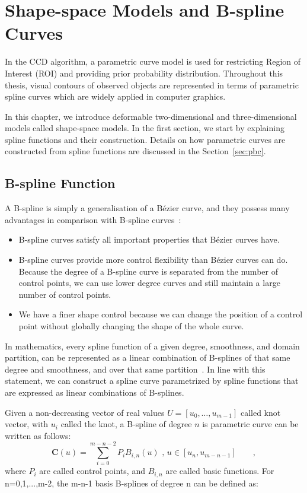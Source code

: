 \chapter{Shape-space Models and B-spline Curves}
\label{chapter:bspline}
In the CCD algorithm, a parametric curve model is used for
restricting Region of Interest (ROI) and providing prior probability distribution. 
Throughout this thesis, visual contours of observed objects are represented in terms of
parametric spline curves which are widely applied in computer graphics.

In this chapter, we introduce deformable two-dimensional and three-dimensional models called
shape-space models.  In the first section, we start by explaining
spline functions and their construction. Details on how parametric
curves are constructed from spline functions are discussed in the
Section~\ref{sec:pbc}. %
\section{B-spline Function}
\label{sec:bsc}
A B-spline is simply a generalisation of a B\'ezier curve, and they possess many
advantages in comparison with B-spline curves~\cite{compgeo}:
\begin{itemize}
\item B-spline curves satisfy all important properties that B\'ezier curves have.
\item B-spline curves provide more control flexibility than B\'ezier
  curves can do. Because the degree of a B-spline curve is separated
  from the number of control points, we can use lower degree curves
  and still maintain a large number of control points.
\item We have a finer shape control because we can change the position
  of a control point without globally changing the shape of
  the whole curve.
\end{itemize} 

In mathematics, every spline function of a given degree,
smoothness, and domain partition, can be represented as a linear
combination of B-splines of that same degree and smoothness, and over
that same partition~\cite{press2007numerical}. In line with this statement, we can
construct  a spline curve parametrized by spline functions that are
expressed as linear combinations of B-splines. 

Given a non-decreasing vector of real values $U = [u_0, \ldots,
u_{m-1}]$ called knot vector, with $u_i$ called the knot, a
B-spline of degree $n$ is parametric curve can be written as follows:
\begin{equation}
  \label{eq:4.1}
  \mathbf{C}(u) =  \sum_{i=0}^{m-n-2} P_{i} B_{i,n}(u) \mbox{ , } u \in [u_{n},u_{m-n-1}]\qquad,
\end{equation}
where $P_i$ are called control points, and $B_{i,n}$ are called
basic functions. For n=0,1,...,m-2, the m-n-1 basis B-splines of degree
n can be defined as:


